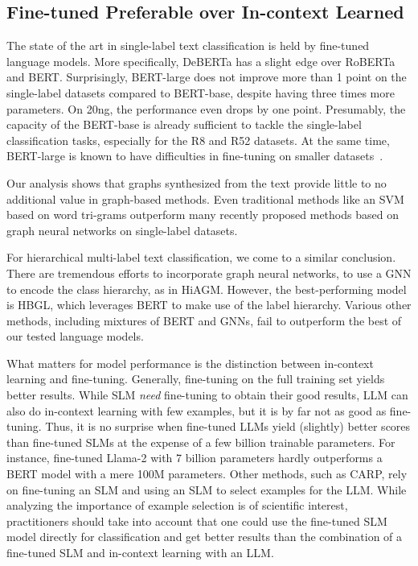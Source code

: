 \subsection{Fine-tuned \SLMs Preferable over In-context Learned \LLMs}

The state of the art in single-label text classification is held by fine-tuned language models. 
More specifically, DeBERTa has a slight edge over RoBERTa and BERT.
Surprisingly, BERT-large does not improve more than 1 point on the single-label datasets compared to BERT-base, despite having three times more parameters.
On 20ng, the performance even drops by one point.
Presumably, the capacity of the BERT-base is already sufficient to tackle the single-label classification tasks, especially for the R8 and R52 datasets. 
At the same time, BERT-large is known to have difficulties in fine-tuning on smaller datasets~\cite{DBLP:conf/naacl/DevlinCLT19}.

Our analysis shows that graphs synthesized from the text provide little to no additional value in graph-based methods. 
Even traditional methods like an SVM based on word tri-grams outperform many recently proposed methods based on graph neural networks on single-label datasets.

For hierarchical multi-label text classification, we come to a similar conclusion.
There are tremendous efforts to incorporate graph neural networks, \eg to use a GNN to encode the class hierarchy, as in HiAGM. 
However, the best-performing model is HBGL, which leverages BERT to make use of the label hierarchy. 
Various other methods, including mixtures of BERT and GNNs, fail to outperform the best of our tested language models.

What matters for model performance is the distinction between in-context learning and fine-tuning. Generally, fine-tuning on the full training set yields better results. While SLM \emph{need} fine-tuning to obtain their good results, LLM can also do in-context learning with few examples, but it is by far not as good as fine-tuning. Thus, it is no surprise when fine-tuned LLMs yield (slightly) better scores than fine-tuned SLMs at the expense of a few billion trainable parameters. For instance, fine-tuned Llama-2 with 7 billion parameters hardly outperforms a BERT model with a mere 100M parameters. 
Other methods, such as CARP, rely on fine-tuning an SLM and using an SLM to select examples for the LLM. 
While analyzing the importance of example selection is of scientific interest, practitioners should take into account that one could use the fine-tuned SLM model directly for classification and get better results than the combination of a fine-tuned SLM and in-context learning with an LLM.

